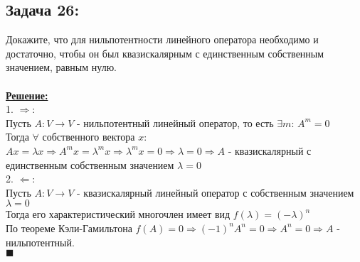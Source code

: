 \documentclass[a4paper,12pt,titlepage,final]{article}
\begin{document}
\subsection*{Задача 26:}
\noindent Докажите, что для нильпотентности линейного оператора необходимо и достаточно, чтобы он был квазискалярным с единственным собственным значением, равным нулю. \\ \\
\textbf{\underline{Решение:}} \\
1. $\Rightarrow$: \\
Пусть $A: V \rightarrow V$ - нильпотентный линейный оператор, то есть $\exists m$: $A^m = 0$ \\
Тогда $\forall$ собственного вектора $x$: $Ax = \lambda x \Rightarrow A^m x = \lambda^m x \Rightarrow
\lambda^m x = 0 \Rightarrow \lambda = 0 \Rightarrow A$ - квазискалярный с единственным собственным значением $\lambda = 0$ \\
2. $\Leftarrow$: \\
Пусть $A: V \rightarrow V$ - квазискалярный линейный оператор с собственным значением $\lambda = 0$ \\
Тогда его характеристический многочлен имеет вид $f(\lambda) = (-\lambda)^n$ \\
По теореме Кэли-Гамильтона $f(A) = 0 \Rightarrow (-1)^n A^n = 0 \Rightarrow A^n = 0 \Rightarrow A$ - нильпотентный. \\
$\blacksquare$ \\ \\ \\


\end{document}
